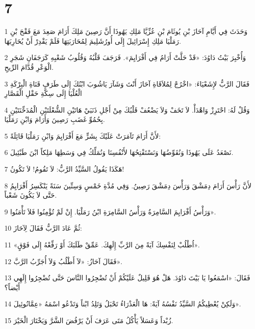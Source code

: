 \chapter{7}

\par 1 وَحَدَثَ فِي أَيَّامِ آحَازَ بْنِ يُوثَامَ بْنِ عُزِّيَّا مَلِكِ يَهُوذَا أَنَّ رَصِينَ مَلِكَ أَرَامَ صَعِدَ مَعَ فَقْحَ بْنِ رَمَلْيَا مَلِكِ إِسْرَائِيلَ إِلَى أُورُشَلِيمَ لِمُحَارَبَتِهَا فَلَمْ يَقْدِرْ أَنْ يُحَارِبَهَا.
\par 2 وَأُخْبِرَ بَيْتُ دَاوُدَ: «قَدْ حَلَّتْ أَرَامُ فِي أَفْرَايِمَ». فَرَجَفَ قَلْبُهُ وَقُلُوبُ شَعْبِهِ كَرَجَفَانِ شَجَرِ الْوَعْرِ قُدَّامَ الرِّيحِ.
\par 3 فَقَالَ الرَّبُّ لإِشَعْيَاءَ: «اخْرُجْ لِمُلاَقَاةِ آحَازَ أَنْتَ وَشَآرَ يَاشُوبَ ابْنُكَ إِلَى طَرَفِ قَنَاةِ الْبِرْكَةِ الْعُلْيَا إِلَى سِكَّةِ حَقْلِ الْقَصَّارِ
\par 4 وَقُلْ لَهُ: احْتَرِزْ وَاهْدَأْ. لاَ تَخَفْ وَلاَ يَضْعُفْ قَلْبُكَ مِنْ أَجْلِ ذَنَبَيْ هَاتَيْنِ الشُّعْلَتَيْنِ الْمُدَخِّنَتَيْنِ بِحُمُوِّ غَضَبِ رَصِينَ وَأَرَامَ وَابْنِ رَمَلْيَا.
\par 5 لأَنَّ أَرَامَ تَآمَرَتْ عَلَيْكَ بِشَرٍّ مَعَ أَفْرَايِمَ وَابْنِ رَمَلْيَا قَائِلَةً:
\par 6 نَصْعَدُ عَلَى يَهُوذَا وَنُقَوِّضُهَا وَنَسْتَفْتِحُهَا لأَنْفُسِنَا وَنُمَلِّكُ فِي وَسَطِهَا مَلِكاً ابْنَ طَبْئِيلَ.
\par 7 هَكَذَا يَقُولُ السَّيِّدُ الرَّبُّ: لاَ تَقُومُ! لاَ تَكُونُ!
\par 8 لأَنَّ رَأْسَ أَرَامَ دِمَشْقَ وَرَأْسَ دِمَشْقَ رَصِينُ. وَفِي مُدَّةِ خَمْسٍ وَسِتِّينَ سَنَةً يَنْكَسِرُ أَفْرَايِمُ حَتَّى لاَ يَكُونَ شَعْباً.
\par 9 وَرَأْسُ أَفْرَايِمَ السَّامِرَةُ وَرَأْسُ السَّامِرَةِ ابْنُ رَمَلْيَا. إِنْ لَمْ تُؤْمِنُوا فَلاَ تَأْمَنُوا».
\par 10 ثُمَّ عَادَ الرَّبُّ فَقَالَ لِآحَازَ:
\par 11 «اُطْلُبْ لِنَفْسِكَ آيَةً مِنَ الرَّبِّ إِلَهِكَ. عَمِّقْ طَلَبَكَ أَوْ رَفِّعْهُ إِلَى فَوْقٍ».
\par 12 فَقَالَ آحَازُ: «لاَ أَطْلُبُ وَلاَ أُجَرِّبُ الرَّبَّ».
\par 13 فَقَالَ: «اسْمَعُوا يَا بَيْتَ دَاوُدَ. هَلْ هُوَ قَلِيلٌ عَلَيْكُمْ أَنْ تُضْجِرُوا النَّاسَ حَتَّى تُضْجِرُوا إِلَهِي أَيْضاً؟
\par 14 وَلَكِنْ يُعْطِيكُمُ السَّيِّدُ نَفْسُهُ آيَةً: هَا الْعَذْرَاءُ تَحْبَلُ وَتَلِدُ ابْناً وَتَدْعُو اسْمَهُ «عِمَّانُوئِيلَ».
\par 15 زُبْداً وَعَسَلاً يَأْكُلُ مَتَى عَرَفَ أَنْ يَرْفُضَ الشَّرَّ وَيَخْتَارَ الْخَيْرَ.
